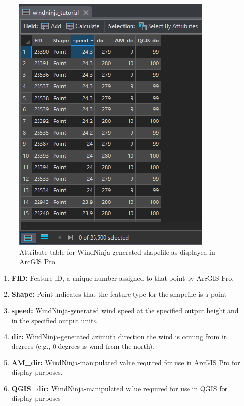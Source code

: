 \documentclass[12pt]{article}
\begin{document}
\begin{figure}[H]
	\centering
	\includegraphics[scale=0.9]{arc_1.png}
	\caption{Attribute table for WindNinja-generated shapefile as displayed in ArcGIS Pro.}
	\label{fig:Figure1}
\end{figure}

\begin{enumerate}[label=(\alph*)]
\item \textbf{FID:} Feature ID, a unique number assigned to that point by ArcGIS Pro.
\item \textbf{Shape:} Point indicates that the feature type for the shapefile is a point
\item \textbf{speed:} WindNinja-generated wind speed at the specified output height and in the specified output units.
\item \textbf{dir:} WindNinja-generated azimuth direction the wind is coming from in degrees (e.g., 0 degrees is wind from
the north).
\item \textbf{AM\_dir:} WindNinja-manipulated value required for use in ArcGIS Pro for display purposes.
\item \textbf{QGIS\_dir:} WindNinja-manipulated value required for use in QGIS for display purposes
\end{enumerate}
\end{document}
